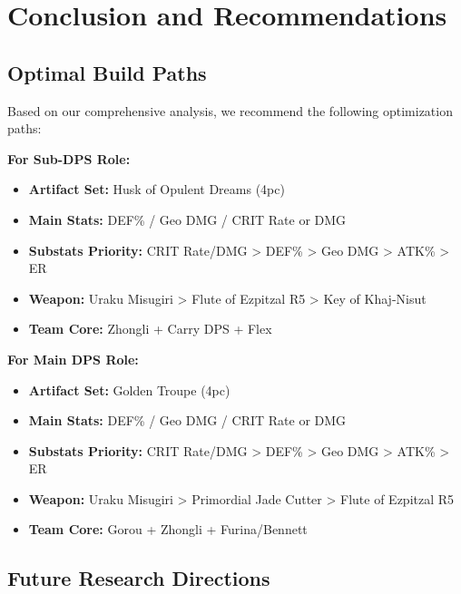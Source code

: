 \documentclass[12pt,a4paper]{article}
\begin{document}
\section{Conclusion and Recommendations}

\subsection{Optimal Build Paths}

Based on our comprehensive analysis, we recommend the following optimization paths:

\begin{tcolorbox}[colback=c0color!5, colframe=c0color, title=C0 Chiori Recommendations]
\textbf{For Sub-DPS Role:}
\begin{itemize}
    \item \textbf{Artifact Set:} Husk of Opulent Dreams (4pc)
    \item \textbf{Main Stats:} DEF\% / Geo DMG / CRIT Rate or DMG
    \item \textbf{Substats Priority:} CRIT Rate/DMG > DEF\% > Geo DMG > ATK\% > ER
    \item \textbf{Weapon:} Uraku Misugiri > Flute of Ezpitzal R5 > Key of Khaj-Nisut
    \item \textbf{Team Core:} Zhongli + Carry DPS + Flex
\end{itemize}
\end{tcolorbox}

\begin{tcolorbox}[colback=c6color!5, colframe=c6color, title=C6 Chiori Recommendations]
\textbf{For Main DPS Role:}
\begin{itemize}
    \item \textbf{Artifact Set:} Golden Troupe (4pc)
    \item \textbf{Main Stats:} DEF\% / Geo DMG / CRIT Rate or DMG
    \item \textbf{Substats Priority:} CRIT Rate/DMG > DEF\% > Geo DMG > ATK\% > ER
    \item \textbf{Weapon:} Uraku Misugiri > Primordial Jade Cutter > Flute of Ezpitzal R5
    \item \textbf{Team Core:} Gorou + Zhongli + Furina/Bennett
\end{itemize}
\end{tcolorbox}

\subsection{Future Research Directions}
\end{document}
